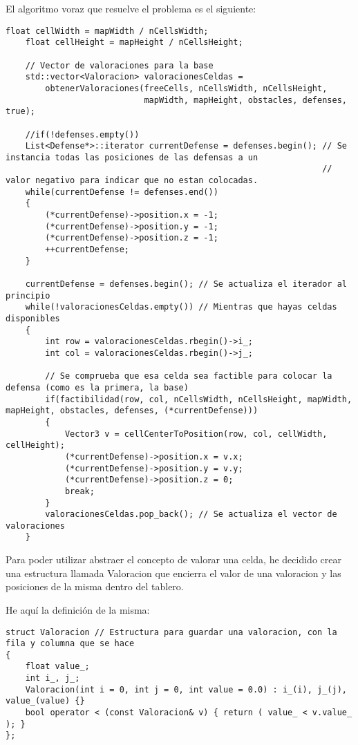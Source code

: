 El algoritmo voraz que resuelve el problema es el siguiente:

\lstset{language=C++, texcl=true}
\begin{lstlisting}[frame=single]
    float cellWidth = mapWidth / nCellsWidth;
    float cellHeight = mapHeight / nCellsHeight;

    // Vector de valoraciones para la base
    std::vector<Valoracion> valoracionesCeldas =
        obtenerValoraciones(freeCells, nCellsWidth, nCellsHeight,
                            mapWidth, mapHeight, obstacles, defenses, true);

    //if(!defenses.empty())
    List<Defense*>::iterator currentDefense = defenses.begin(); // Se instancia todas las posiciones de las defensas a un
                                                                // valor negativo para indicar que no estan colocadas.
    while(currentDefense != defenses.end())
    {
        (*currentDefense)->position.x = -1;
        (*currentDefense)->position.y = -1;
        (*currentDefense)->position.z = -1;
        ++currentDefense;
    }

    currentDefense = defenses.begin(); // Se actualiza el iterador al principio
    while(!valoracionesCeldas.empty()) // Mientras que hayas celdas disponibles
    {
        int row = valoracionesCeldas.rbegin()->i_;
        int col = valoracionesCeldas.rbegin()->j_;

        // Se comprueba que esa celda sea factible para colocar la defensa (como es la primera, la base)
        if(factibilidad(row, col, nCellsWidth, nCellsHeight, mapWidth, mapHeight, obstacles, defenses, (*currentDefense)))
        {
            Vector3 v = cellCenterToPosition(row, col, cellWidth, cellHeight);
            (*currentDefense)->position.x = v.x;
            (*currentDefense)->position.y = v.y;
            (*currentDefense)->position.z = 0;
            break;
        }
        valoracionesCeldas.pop_back(); // Se actualiza el vector de valoraciones
    }
\end{lstlisting}

Para poder utilizar abstraer el concepto de valorar una celda,
he decidido crear una estructura llamada Valoracion que encierra
el valor de una valoracion y las posiciones de la misma dentro del
tablero.

He aquí la definición de la misma:

\lstset{language=C++, texcl=true}
\begin{lstlisting}[frame=single]
struct Valoracion // Estructura para guardar una valoracion, con la fila y columna que se hace
{
    float value_;
    int i_, j_;
    Valoracion(int i = 0, int j = 0, int value = 0.0) : i_(i), j_(j), value_(value) {}
    bool operator < (const Valoracion& v) { return ( value_ < v.value_ ); }
};
\end{lstlisting}


